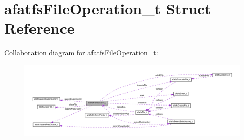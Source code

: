 \hypertarget{structafatfsFileOperation__t}{\section{afatfs\+File\+Operation\+\_\+t Struct Reference}
\label{structafatfsFileOperation__t}
}


Collaboration diagram for afatfs\+File\+Operation\+\_\+t\+:\nopagebreak
\begin{figure}[H]
\begin{center}
\leavevmode
\includegraphics[width=350pt]{structafatfsFileOperation__t__coll__graph}
\end{center}
\end{figure}

